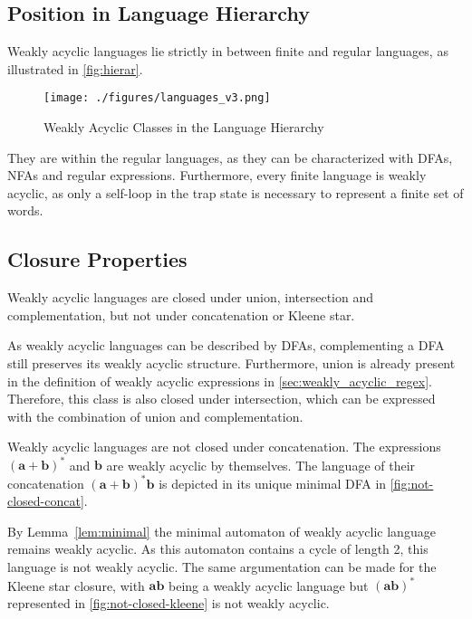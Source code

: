 \subsection{Position in Language Hierarchy}
Weakly acyclic languages lie strictly in between finite and regular languages, as illustrated in \autoref{fig:hierar}.

\begin{figure}[H]
\centering 
\texttt{[image: ./figures/languages\_v3.png]}
\caption{Weakly Acyclic Classes in the Language Hierarchy}\label{fig:hierar}
\end{figure}


They are within the regular languages, as they can be characterized with DFAs, NFAs and regular expressions. Furthermore, every finite language is weakly acyclic, as only a self-loop in the trap state is necessary to represent a finite set of words.

\subsection{Closure Properties}
Weakly acyclic languages are closed under union, intersection and complementation, but not under concatenation or Kleene star. 
\par 
As weakly acyclic languages can be described by DFAs, complementing a DFA still preserves its weakly acyclic structure. Furthermore, union is already present in the definition of weakly acyclic expressions in \autoref{sec:weakly_acyclic_regex}. Therefore, this class is also closed under intersection, which can be expressed with the combination of union and complementation. 
\par
Weakly acyclic languages are not closed under concatenation. The expressions $\bm{(a + b)^{*}}$ and $\bm{b}$ are weakly acyclic by themselves. The language of their concatenation $\bm{(a + b)^{*}b}$ is depicted in its unique minimal DFA in \autoref{fig:not-closed-concat}.

By Lemma~\autoref{lem:minimal} the minimal automaton of weakly acyclic language remains weakly acyclic. As this automaton contains a cycle of length 2, this language is not weakly acyclic. The same argumentation can be made for the Kleene star closure, with $\bm{ab}$ being a weakly acyclic language but $\bm{(ab)^{*}}$ represented in \autoref{fig:not-closed-kleene} is not weakly acyclic. 

